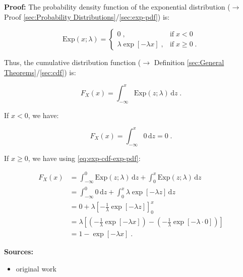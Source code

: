 \documentclass[a4paper,12pt,twoside]{book}
\begin{document}
\vspace{1em}
\textbf{Proof:}  The probability density function of the exponential distribution ($\rightarrow$ Proof \ref{sec:Probability Distributions}/\ref{sec:exp-pdf}) is:

\begin{equation} \label{eq:exp-cdf-exp-pdf}
\mathrm{Exp}(x; \lambda) = \left\{
\begin{array}{rl}
0 \; , & \text{if} \; x < 0 \\
\lambda \exp[-\lambda x] \; , & \text{if} \; x \geq 0 \; .
\end{array}
\right.
\end{equation}

Thus, the cumulative distribution function ($\rightarrow$ Definition \ref{sec:General Theorems}/\ref{sec:cdf}) is:

\begin{equation} \label{eq:exp-cdf-exp-cdf-s1}
F_X(x) = \int_{-\infty}^{x} \mathrm{Exp}(z; \lambda) \, \mathrm{d}z \; .
\end{equation}

If $x < 0$, we have:

\begin{equation} \label{eq:exp-cdf-exp-cdf-s2a}
F_X(x) = \int_{-\infty}^{x} 0 \, \mathrm{d}z = 0 \; .
\end{equation}

If $x \geq 0$, we have using \eqref{eq:exp-cdf-exp-pdf}:

\begin{equation} \label{eq:exp-cdf-exp-cdf-s2b}
\begin{split}
F_X(x) &= \int_{-\infty}^{0} \mathrm{Exp}(z; \lambda) \, \mathrm{d}z + \int_{0}^{x} \mathrm{Exp}(z; \lambda) \, \mathrm{d}z \\
&= \int_{-\infty}^{0} 0 \, \mathrm{d}z + \int_{0}^{x} \lambda \exp[-\lambda z] \, \mathrm{d}z \\
&= 0 + \lambda \left[ -\frac{1}{\lambda} \exp[-\lambda z] \right]_{0}^{x} \\
&= \lambda \left[ \left( -\frac{1}{\lambda} \exp[-\lambda x] \right) - \left( -\frac{1}{\lambda} \exp[-\lambda \cdot 0] \right) \right] \\
&= 1 - \exp[-\lambda x] \; .
\end{split}
\end{equation}


\vspace{1em}
\textbf{Sources:}
\begin{itemize}
\item original work\end{itemize}
\end{document}
